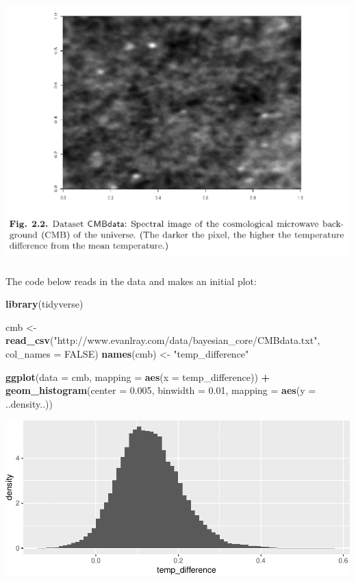 \documentclass[]{article}
\newenvironment{Shaded}{\begin{snugshade}}{\end{snugshade}}
\newcommand{\KeywordTok}[1]{\textcolor[rgb]{0.13,0.29,0.53}{\textbf{#1}}}
\newcommand{\DataTypeTok}[1]{\textcolor[rgb]{0.13,0.29,0.53}{#1}}
\newcommand{\FloatTok}[1]{\textcolor[rgb]{0.00,0.00,0.81}{#1}}
\newcommand{\StringTok}[1]{\textcolor[rgb]{0.31,0.60,0.02}{#1}}
\newcommand{\OtherTok}[1]{\textcolor[rgb]{0.56,0.35,0.01}{#1}}
\newcommand{\OperatorTok}[1]{\textcolor[rgb]{0.81,0.36,0.00}{\textbf{#1}}}
\newcommand{\NormalTok}[1]{#1}
\begin{document}
\includegraphics[height = 4in]{CMBdata_bayesian_core.png}

The code below reads in the data and makes an initial plot:

\begin{Shaded}
\begin{Highlighting}[]
\KeywordTok{library}\NormalTok{(tidyverse)}

\NormalTok{cmb <-}\StringTok{ }\KeywordTok{read_csv}\NormalTok{(}\StringTok{"http://www.evanlray.com/data/bayesian_core/CMBdata.txt"}\NormalTok{,}
    \DataTypeTok{col_names =} \OtherTok{FALSE}\NormalTok{)}
\KeywordTok{names}\NormalTok{(cmb) <-}\StringTok{ "temp_difference"}

\KeywordTok{ggplot}\NormalTok{(}\DataTypeTok{data =}\NormalTok{ cmb, }\DataTypeTok{mapping =} \KeywordTok{aes}\NormalTok{(}\DataTypeTok{x =}\NormalTok{ temp_difference)) }\OperatorTok{+}
\StringTok{  }\KeywordTok{geom_histogram}\NormalTok{(}\DataTypeTok{center =} \FloatTok{0.005}\NormalTok{, }\DataTypeTok{binwidth =} \FloatTok{0.01}\NormalTok{, }\DataTypeTok{mapping =} \KeywordTok{aes}\NormalTok{(}\DataTypeTok{y =}\NormalTok{ ..density..))}
\end{Highlighting}
\end{Shaded}

\includegraphics{20190225_bayes_MCMC_Metropolis_files/figure-latex/unnamed-chunk-1-1.pdf}
\end{document}
